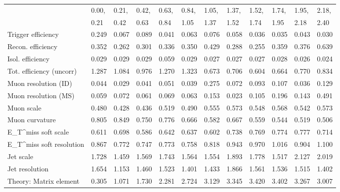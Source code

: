 \begin{tabular}{l|p{0.6cm}p{0.6cm}p{0.6cm}p{0.6cm}p{0.6cm}p{0.6cm}p{0.6cm}p{0.6cm}p{0.6cm}p{0.6cm}p{0.6cm}}
\hline
   & 0.00, & 0.21, & 0.42, & 0.63, & 0.84, & 1.05, & 1.37, & 1.52, & 1.74, & 1.95, & 2.18,  \\ 
   & 0.21 & 0.42 & 0.63 & 0.84 & 1.05 & 1.37 & 1.52 & 1.74 & 1.95 & 2.18 & 2.40  \\ 
\hline
Trigger efficiency                       & 0.249 & 0.067 & 0.089 & 0.041 & 0.063 & 0.076 & 0.058 & 0.036 & 0.035 & 0.043 & 0.030 \\
Recon. efficiency                        & 0.352 & 0.262 & 0.301 & 0.336 & 0.350 & 0.429 & 0.288 & 0.255 & 0.359 & 0.376 & 0.639 \\
Isol. efficiency                         & 0.029 & 0.029 & 0.029 & 0.059 & 0.029 & 0.027 & 0.027 & 0.027 & 0.028 & 0.026 & 0.024 \\
Tot. efficiency (uncorr)                 & 1.287 & 1.084 & 0.976 & 1.270 & 1.323 & 0.673 & 0.706 & 0.604 & 0.664 & 0.770 & 0.834 \\
Muon resolution (ID)                     & 0.044 & 0.029 & 0.041 & 0.051 & 0.039 & 0.275 & 0.072 & 0.093 & 0.107 & 0.036 & 0.129 \\
Muon resolution (MS)                     & 0.059 & 0.072 & 0.061 & 0.069 & 0.063 & 0.153 & 0.023 & 0.105 & 0.196 & 0.143 & 0.491 \\
Muon scale                               & 0.480 & 0.428 & 0.436 & 0.519 & 0.490 & 0.555 & 0.573 & 0.548 & 0.568 & 0.542 & 0.573 \\
Muon curvature                           & 0.805 & 0.849 & 0.750 & 0.776 & 0.666 & 0.582 & 0.667 & 0.559 & 0.544 & 0.519 & 0.506 \\
E_{T}^{miss} soft scale                  & 0.611 & 0.698 & 0.586 & 0.642 & 0.637 & 0.602 & 0.738 & 0.769 & 0.774 & 0.777 & 0.714 \\
E_{T}^{miss} soft resolution             & 0.867 & 0.772 & 0.747 & 0.773 & 0.758 & 0.818 & 0.943 & 0.970 & 1.016 & 0.904 & 1.100 \\
Jet scale                                & 1.728 & 1.459 & 1.569 & 1.743 & 1.564 & 1.554 & 1.893 & 1.778 & 1.517 & 2.127 & 2.019 \\
Jet resolution                           & 1.654 & 1.153 & 1.460 & 1.523 & 1.401 & 1.433 & 1.866 & 1.561 & 1.536 & 1.515 & 1.402 \\
Theory: Matrix element                   & 0.305 & 1.071 & 1.730 & 2.281 & 2.724 & 3.129 & 3.345 & 3.420 & 3.402 & 3.267 & 3.007 \\

\end{tabular}
